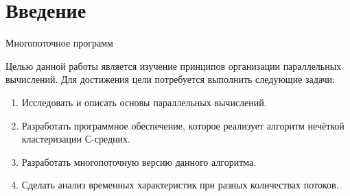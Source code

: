 \chapter*{Введение}

Многопоточное программ

Целью данной работы является изучение принципов организации параллельных вычислений. 
Для достижения цели потребуется выполнить следующие задачи:

\begin{enumerate}
	\item Исследовать и описать основы параллельных вычислений.
	\item Разработать программное обеспечение, которое реализует алгоритм нечёткой кластеризации С-средних.
	\item Разработать многопоточную версию данного алгоритма.
	\item Сделать анализ временных характеристик при разных количествах потоков.
\end{enumerate}